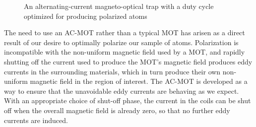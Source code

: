 \begin{figure}[ht]
	\centering
	\hspace*{\fill}
	\hspace*{\fill}
	\caption{An alternating-current magneto-optical trap with a duty cycle optimized for producing polarized atoms}	
	\label{fig:themot}
\end{figure}

The need to use an AC-MOT rather than a typical MOT has arisen as a direct result of our desire to optimally polarize our sample of atoms.  Polarization is incompatible with the non-uniform magnetic field used by a MOT, and rapidly shutting off the current used to produce the MOT's magnetic field produces eddy currents in the surrounding materials, which in turn produce their own non-uniform magnetic field in the region of interest.  The AC-MOT is developed as a way to ensure that the unavoidable eddy currents are behaving as we expect.  With an appropriate choice of shut-off phase, the current in the coils can be shut off when the overall magnetic field is already zero, so that no further eddy currents are induced.   

